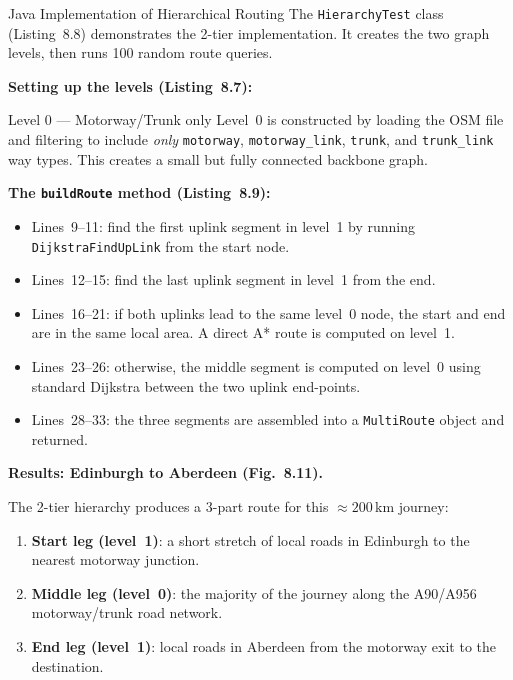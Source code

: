 \documentclass[aspectratio=169,10pt]{beamer}
\begin{document}
\begin{frame}[allowframebreaks]{Java Implementation of Hierarchical Routing}
  The \texttt{HierarchyTest} class (Listing~8.8) demonstrates the 2-tier
  implementation.  It creates the two graph levels, then runs 100 random
  route queries.

  \medskip
  \textbf{Setting up the levels (Listing~8.7):}

  \begin{block}{Level 0 --- Motorway/Trunk only}
    Level~0 is constructed by loading the OSM file and filtering to
    include \emph{only} \texttt{motorway}, \texttt{motorway\_link},
    \texttt{trunk}, and \texttt{trunk\_link} way types.  This creates a
    small but fully connected backbone graph.
  \end{block}

  \medskip
  \textbf{The \texttt{buildRoute} method (Listing~8.9):}

  \begin{itemize}
    \item Lines~9--11: find the first uplink segment in level~1 by running
      \texttt{DijkstraFindUpLink} from the start node.
    \item Lines~12--15: find the last uplink segment in level~1 from the end.
    \item Lines~16--21: if both uplinks lead to the same level~0 node,
      the start and end are in the same local area.  A direct A* route
      is computed on level~1.
    \item Lines~23--26: otherwise, the middle segment is computed on level~0
      using standard Dijkstra between the two uplink end-points.
    \item Lines~28--33: the three segments are assembled into a
      \texttt{MultiRoute} object and returned.
  \end{itemize}

  \framebreak

  \textbf{Results: Edinburgh to Aberdeen (Fig.\ 8.11).}

  The 2-tier hierarchy produces a 3-part route for this $\approx 200$\,km
  journey:

  \begin{enumerate}
    \item \textbf{Start leg (level~1)}: a short stretch of local roads in
      Edinburgh to the nearest motorway junction.
    \item \textbf{Middle leg (level~0)}: the majority of the journey along
      the A90/A956 motorway/trunk road network.
    \item \textbf{End leg (level~1)}: local roads in Aberdeen from the
      motorway exit to the destination.
  \end{enumerate}


\end{frame}
\end{document}
